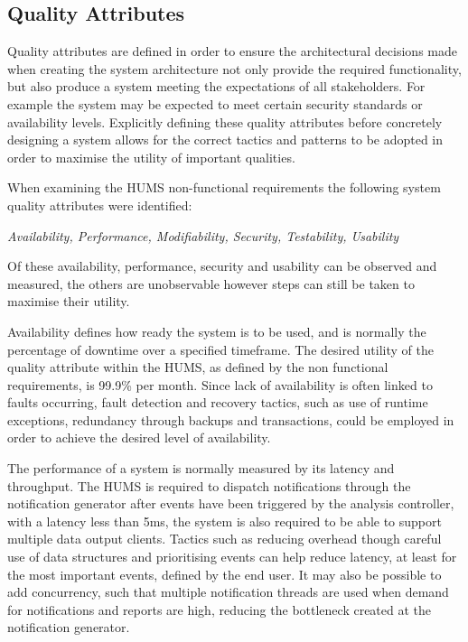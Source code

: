 \documentclass[10pt,a4paper]{article}
\begin{document}
\subsection{Quality Attributes}
Quality attributes are defined in order to ensure the architectural decisions made when 
creating the system architecture not only provide the required functionality,
but also produce a system meeting the expectations of all stakeholders. For example the 
system may be expected to meet certain security standards or availability levels. 
Explicitly defining these quality attributes before concretely designing a system allows for 
the correct tactics and patterns to be adopted in order to maximise the utility of important 
qualities.

When examining the HUMS non-functional requirements the following system quality 
attributes were identified:
	\begin{center}
	\textit{
		Availability, Performance, Modifiability, Security, Testability, Usability}
	\end{center}
Of these availability, performance, security and usability can be observed and measured, 
the others are unobservable however steps can still be taken to maximise their utility.

Availability defines how ready the system is to be used, and is normally the percentage of 
downtime over a specified timeframe. The desired utility of the quality attribute within the HUMS, as defined by the non functional requirements, is  99.9\% per month. Since lack of 
availability is often linked to faults occurring, fault detection and recovery tactics, such as 
use of runtime exceptions, redundancy through backups and transactions, could be 
employed in order to achieve the desired level of availability. 

The performance of a system is normally measured by its latency and throughput. The 
HUMS is required to dispatch notifications through the notification generator after events 
have been triggered by the analysis controller, with a latency less than 5ms, the system is 
also required to be able to support multiple data output clients. Tactics such as reducing overhead though careful use of data structures and prioritising events can help reduce latency, at 
least for the most important events, defined by the end user. It may also be possible to 
add concurrency, such that multiple notification threads are used when demand for 
notifications and reports are high, reducing the bottleneck created at the notification 
generator.
\end{document}
